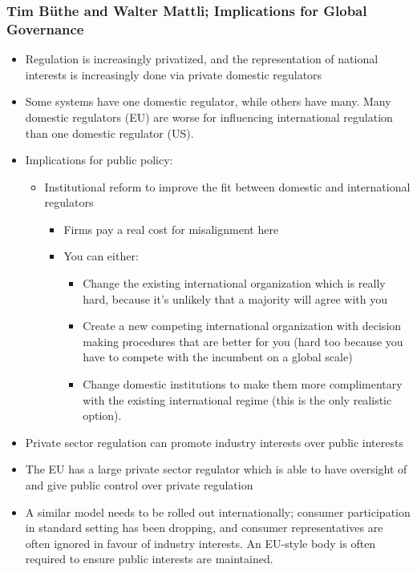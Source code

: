 \documentclass[11pt]{article}
\begin{document}
\subsubsection{Tim Büthe and Walter Mattli; Implications for Global Governance}
\label{sec:orgd0a6f44}
\begin{itemize}
\item Regulation is increasingly privatized, and the representation of national
interests is increasingly done via private domestic regulators
\item Some systems have one domestic regulator, while others have many. Many domestic
regulators (EU) are worse for influencing international regulation than one
domestic regulator (US).
\item Implications for public policy:
\begin{itemize}
\item Institutional reform to improve the fit between domestic and international
regulators
\begin{itemize}
\item Firms pay a real cost for misalignment here
\item You can either:
\begin{itemize}
\item Change the existing international organization which is really hard,
because it's unlikely that a majority will agree with you
\item Create a new competing international organization with decision making
procedures that are better for you (hard too because you have to compete
with the incumbent on a global scale)
\item Change domestic institutions to make them more complimentary with the
existing international regime (this is the only realistic option).
\end{itemize}
\end{itemize}
\end{itemize}
\item Private sector regulation can promote industry interests over public interests
\item The EU has a large private sector regulator which is able to have oversight
of and give public control over private regulation
\item A similar model needs to be rolled out internationally; consumer participation
in standard setting has been dropping, and consumer representatives are often
ignored in favour of industry interests. An EU-style body is often required to
ensure public interests are maintained.
\end{itemize}
\end{document}
